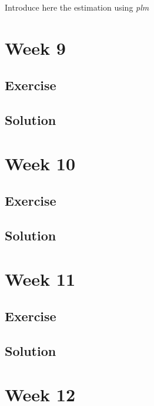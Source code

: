 \documentclass[
]{book}
\begin{document}
{Introduce here the estimation using \emph{plm} }

\hypertarget{week-9}{%
\chapter{Week 9}\label{week-9}}

\hypertarget{exercise-5}{%
\section{Exercise}\label{exercise-5}}

\hypertarget{solution-5}{%
\section{Solution}\label{solution-5}}

\hypertarget{week-10}{%
\chapter{Week 10}\label{week-10}}

\hypertarget{exercise-6}{%
\section{Exercise}\label{exercise-6}}

\hypertarget{solution-6}{%
\section{Solution}\label{solution-6}}

\hypertarget{week-11}{%
\chapter{Week 11}\label{week-11}}

\hypertarget{exercise-7}{%
\section{Exercise}\label{exercise-7}}

\hypertarget{solution-7}{%
\section{Solution}\label{solution-7}}

\hypertarget{week-12}{%
\chapter{Week 12}\label{week-12}}
\end{document}
